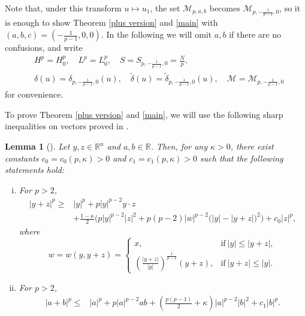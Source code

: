 \documentclass[11pt]{article}
\newtheorem{lemma}[theorem]{Lemma}
\newcommand{\R}{\mathbb{R}}
\numberwithin{equation}{section}
\begin{document}
Note that, under this transform $u\mapsto u_1$, the set $\mathcal{M}_{p,a,b}$ becomes $\mathcal{M}_{p,-\frac{1}{p-1},0}$, so it is enough to show Theorem \ref{plus version} and \ref{main} with $(a,b,c) = (-\frac{1}{p-1},0,0)$. In the following we will omit $a,b$ if there are no confusions, and write
\begin{equation*}
    \begin{aligned}
        &  H^p=H^p_0, \quad L^p=L^p_0, \quad S=S_{p,-\frac{1}{p-1},0} = \frac{N}{p},\\
        & \delta(u) = \delta_{p,-\frac{1}{p-1},0}(u), \quad \tilde{\delta}(u) =  \tilde{\delta}_{p,-\frac 1{p-1},0}(u),\quad \mathcal{M} = \mathcal{M}_{p,-\frac{1}{p-1},0}
    \end{aligned}
\end{equation*}
for convenience.

To prove Theorem \ref{plus version} and \ref{main}, we will use the following sharp inequalities on vectors proved in \cite{Figalli2022}.

\begin{lemma}[{\cite[Lemma 2.1 and 2.4]{Figalli2022}}]\label{primary}
    Let $y,z\in \R^n$ and $a,b\in \R$. Then, for any $\kappa>0$, there exist constants $c_0=c_0(p,\kappa)>0$ and $c_1=c_1(p,\kappa)>0$ such that the following statements hold:
    \begin{enumerate}[(i)]
        \item For $p>2$, \begin{align*}
            |y+z|^p \ge{}& |y|^p + p|y|^{p-2}y\cdot z \\
            & + \frac{1-\kappa}{2}\Big(p|y|^{p-2}|z|^2 + p(p-2)|w|^{p-2}\big(|y|-|y+z|\big)^2\Big)+c_0|z|^p,
        \end{align*}
        where
        \[ w=w(y,y+z) = \begin{cases}
            x, & \text{if}\ |y|\le |y+z|,\\
            (\frac{|y+z|}{|y|})^{\frac{1}{p-2}}(y+z), &\text{if}\ |y+z|\le |y|.
        \end{cases}\]
        \item For $p>2$, \begin{align*}
            |a+b|^p \le{}& |a|^p + p|a|^{p-2}ab + \left(\frac{p(p-1)}{2}+\kappa\right)|a|^{p-2}|b|^2 + c_1|b|^p.
        \end{align*}
    \end{enumerate}
\end{lemma}
\end{document}

